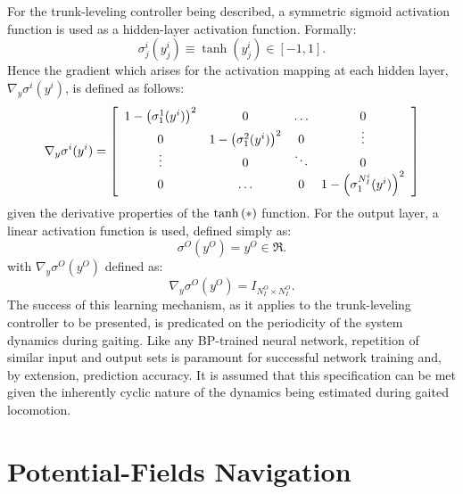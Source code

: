 		For the trunk-leveling controller being described, a symmetric sigmoid activation function is used as a hidden-layer activation function. Formally:
			\begin{equation}
				\sigma_{j}^{i}(y_{j}^{i}) \equiv \tanh(y_{j}^{i}) \in [-1,1]. 
				\label{eq::activation_function}
			\end{equation}
		Hence the gradient which arises for the activation mapping at each hidden layer, $\nabla_{y} \sigma^{i}(y^{i})$, is defined as follows: 
		\newcommand{\acti}[1]{1 - \wrap{\sigma^{#1}_{1}(y^{i})}^{2}}
		\begin{equation}
			\nabla_{y} \sigma^{i}(y^{i})  =
			\left[
			\begin{array}{cccc}
				\acti{1} 	&	0		&	\ldots 		&	0 			\\	
				0			&	\acti{2}&	0			& 	\vdots 		\\
				\vdots 		&	0		& 	\ddots 		& 	0			\\
					0			&	\ldots	&	0			& 	\acti{N_{I}^{i}}
			\end{array}
			\right]
			\label{eq::bp_sigmoid_deriv}
		\end{equation} 
		given the derivative properties of the $\tanh\left(*\right)$ function. For the output layer, a linear activation function is used, defined simply as:
			\begin{equation}
				\sigma^{O}(y^{O}) = y^{O} \in \Re. 
				\label{eq::output_activation_function}
			\end{equation}
		with $\nabla_{y}\sigma^{O}(y^{O})$ defined as:
			\begin{equation}
				\nabla_{y}\sigma^{O}(y^{O}) = I_{N_{I}^{O}\times N_{I}^{O}} . 
				\label{eq::bp_linear_deriv}
			\end{equation}		
		The success of this learning mechanism, as it applies to the trunk-leveling controller to be presented, is predicated on the periodicity of the system dynamics during gaiting. Like any BP-trained neural network, repetition of similar input and output sets is paramount for successful network training and, by extension, prediction accuracy. It is assumed that this specification can be met given the inherently cyclic nature of the dynamics being estimated during gaited locomotion. 




	\section{Potential-Fields Navigation}

